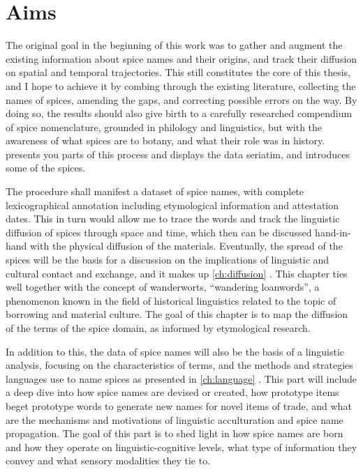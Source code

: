 \section{Aims}

The original goal in the beginning of this work was to gather and augment the existing information about spice names and their origins, and track their diffusion on spatial and temporal trajectories. This still constitutes the core of this thesis, and I hope to achieve it by combing through the existing literature, collecting the names of spices, amending the gaps, and correcting possible errors on the way. By doing so, the results should also give birth to a carefully researched compendium of spice nomenclature, grounded in philology and linguistics, but with the awareness of what spices are to botany, and what their role was in history.   presents you parts of this process and displays the data seriatim, and introduces some of the spices.

The procedure shall manifest a dataset of spice names, with complete lexicographical annotation including etymological information and attestation dates. This in turn would allow me to trace the words and track the linguistic diffusion of spices through space and time, which then can be discussed hand-in-hand with the physical diffusion of the materials. Eventually, the spread of the spices will be the basis for a discussion on the implications of linguistic and cultural contact and exchange, and it makes up \cref{ch:diffusion} . This chapter ties well together with the concept of \glspl{wanderwort}, ``wandering loanwords'', a phenomenon known in the field of historical linguistics related to the topic of borrowing and material culture. The goal of this chapter is to map the diffusion of the terms of the spice domain, as informed by etymological research.

In addition to this, the data of spice names will also be the basis of a linguistic analysis, focusing on the characteristics of terms, and the methods and strategies languages use to name spices as presented in \cref{ch:language} . This part will include a deep dive into how spice names are devised or created, how prototype items beget prototype words to generate new names for novel items of trade, and what are the mechanisms and motivations of linguistic acculturation and spice name propagation. The goal of this part is to shed light in how spice names are born and how they operate on linguistic-cognitive levels, what type of information they convey and what sensory modalities they tie to.

